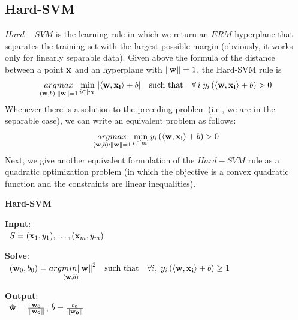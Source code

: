 \documentclass[12pt]{report}
\theoremstyle{plain}
\newcommand\sprod[2]{\langle \vb{#1},\vb{#2}\rangle}
\begin{document}
\begin{flushleft}
\section{Hard-SVM}
$Hard-SVM$ is the learning rule in which we return an $ERM$ hyperplane that separates the training set with the largest possible margin (obviously, it works only for linearly separable data). Given above the formula of the distance between a point $\vb{x}$ and an hyperplane with $\norm{\vb{w}}=1$, the Hard-SVM rule is
\[ \underset{(\vb{w},b):\norm{\vb{w}}=1}{argmax} \min_{i\in[m]}\abs{\sprod{w}{x_i}+b} \quad\text{such that}\quad \forall\,i\; y_i\left(\sprod{w}{x_i}+b\right)>0 \]
Whenever there is a solution to the preceding problem (i.e., we are in the separable case), we can write an equivalent problem as follows:
\begin{equation}
\underset{(\vb{w},b):\norm{\vb{w}}=1}{argmax} \min_{i\in[m]} y_i\left(\sprod{w}{x_i}+b\right)>0
\label{eq:SVM}
\end{equation}
Next, we give another equivalent formulation of the $Hard-SVM$ rule as a quadratic optimization problem (in which the objective is a convex quadratic function and the constraints are linear inequalities).
\begin{tcolorbox}
	\begin{center}
		\textbf{Hard-SVM}
	\end{center}
	\textbf{Input}:\\
	\-\ \qquad $S=(\vb{x}_1,y_1),\dots,(\vb{x}_m,y_m)$
	
	\textbf{Solve}:\\
	\-\ \qquad $(\vb{w}_0,b_0) = \underset{(\vb{w},b)}{argmin\norm{\vb{w}}}^2\quad\text{such that}\quad\forall i,\; y_i\left(\sprod{w}{x_i}+b\right)\geq 1$
	
	\textbf{Output}:\\
	\-\ \qquad $\hat{\vb{w}}=\frac{\vb{w_0}}{\norm{\vb{w_0}}}$, $\hat{b} = \frac{b_0}{\norm{\vb{w_0}}}$
	

\end{tcolorbox}
\end{flushleft}
\end{document}
